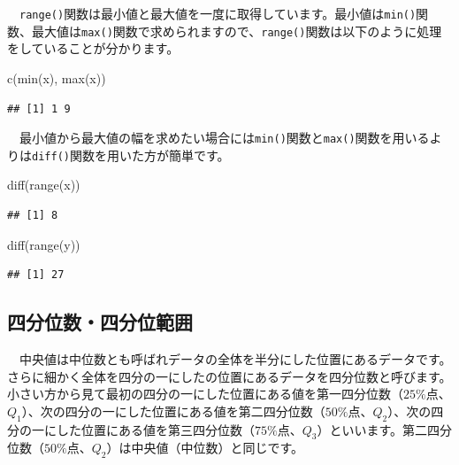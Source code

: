 \documentclass[
  12pt,
]{book}
\newenvironment{Shaded}{\begin{snugshade}}{\end{snugshade}}
\newcommand{\FunctionTok}[1]{\textcolor[rgb]{0.00,0.00,0.00}{#1}}
\newcommand{\NormalTok}[1]{#1}
\begin{document}
　\texttt{range()}関数は最小値と最大値を一度に取得しています。最小値は\texttt{min()}関数、最大値は\texttt{max()}関数で求められますので、\texttt{range()}関数は以下のように処理をしていることが分かります。

\begin{Shaded}
\begin{Highlighting}[numbers=left,,]
\FunctionTok{c}\NormalTok{(}\FunctionTok{min}\NormalTok{(x), }\FunctionTok{max}\NormalTok{(x))}
\end{Highlighting}
\end{Shaded}

\begin{verbatim}
## [1] 1 9
\end{verbatim}

　最小値から最大値の幅を求めたい場合には\texttt{min()}関数と\texttt{max()}関数を用いるよりは\texttt{diff()}関数を用いた方が簡単です。

\begin{Shaded}
\begin{Highlighting}[numbers=left,,]
\FunctionTok{diff}\NormalTok{(}\FunctionTok{range}\NormalTok{(x))}
\end{Highlighting}
\end{Shaded}

\begin{verbatim}
## [1] 8
\end{verbatim}

\begin{Shaded}
\begin{Highlighting}[numbers=left,,]
\FunctionTok{diff}\NormalTok{(}\FunctionTok{range}\NormalTok{(y))}
\end{Highlighting}
\end{Shaded}

\begin{verbatim}
## [1] 27
\end{verbatim}

\hypertarget{ux56dbux5206ux4f4dux6570ux56dbux5206ux4f4dux7bc4ux56f2}{%
\subsection{\texorpdfstring{四分位数・四分位範囲}{四分位数・四分位範囲}}\label{ux56dbux5206ux4f4dux6570ux56dbux5206ux4f4dux7bc4ux56f2}}

　中央値は中位数とも呼ばれデータの全体を半分にした位置にあるデータです。さらに細かく全体を四分の一にしたの位置にあるデータを四分位数と呼びます。小さい方から見て最初の四分の一にした位置にある値を第一四分位数（\(25\%\)点、\(Q_1\)）、次の四分の一にした位置にある値を第二四分位数（\(50\%\)点、\(Q_2\)）、次の四分の一にした位置にある値を第三四分位数（\(75\%\)点、\(Q_3\)）といいます。第二四分位数（\(50\%\)点、\(Q_2\)）は中央値（中位数）と同じです。
\end{document}
